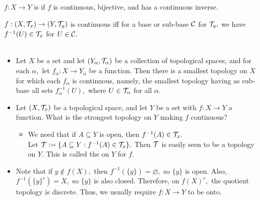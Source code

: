\begin{defn}
$f:X\rightarrow Y$ is  if $f$ is continuous, bijective, and has a continuous inverse.
\end{defn}

\begin{prop}
$f:(X,\mathcal{T}_x)\rightarrow (Y,\mathcal{T}_y)$ is continuous iff for a base or sub-base $\mathcal{C}$ for $\mathcal{T}_y,$ we have $f^{-1}(U)\in\mathcal{T}_x$ for $U\in\mathcal{C}.$ \\ \\
\end{prop}

\noindent\begin{itemize}
\item Let $X$ be a set and let $(Y_{\alpha},\mathcal{T}_{\alpha})$ be a collection of topological spaces, and for each $\alpha,$ let $f_{\alpha}:X\rightarrow Y_{\alpha}$ be a function. Then there is a smallest topology on $X$ for which each $f_{\alpha}$ is continuous, namely, the smallest topology having as sub-base all sets $f^{-1}_{\alpha}(U),$ where $U\in\mathcal{T}_{\alpha}$ for all $\alpha.$
\item Let $(X,\mathcal{T}_x)$ be a topological space, and let $Y$ be a set with $f:X\rightarrow Y$ a function. What is the strongest topology on $Y$ making $f$ continuous?
\begin{itemize}
\item We need that if $A\subseteq Y$ is open, then $f^{-1}(A)\in\mathcal{T}_x.$ \\ Let $\mathcal{T}:=\{A\subseteq Y: f^{-1}(A)\in\mathcal{T}_x\}.$ Then $\mathcal{T}$ is easily seen to be a topology on $Y.$ This is called the  on $Y$ for $f.$
\end{itemize}
\item Note that if $y\not\in f(X),$ then $f^{-1}(\{y\})=\varnothing,$ so $\{y\}$ is open. Also, $f^{-1}(\{y\}^c)=X,$ so $\{y\}$ is also closed. Therefore, on $f(X)^c,$ the quotient topology is discrete. Thus, we usually require $f:X\rightarrow Y$ to be onto.
\end{itemize}


